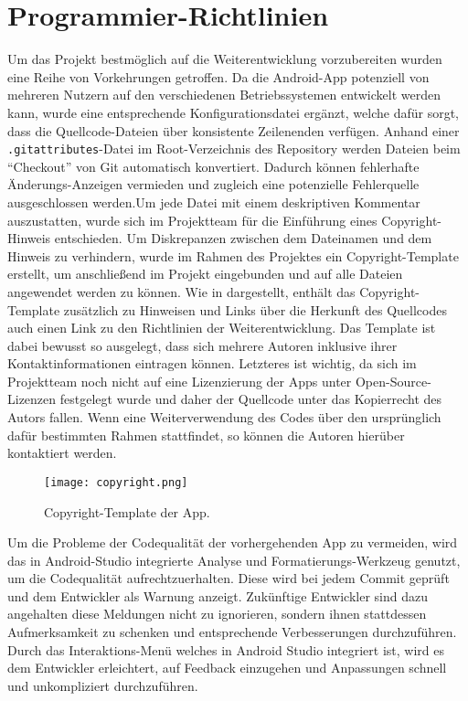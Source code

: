 \newpage

\section{Programmier-Richtlinien}

Um das Projekt bestmöglich auf die Weiterentwicklung vorzubereiten wurden eine Reihe von Vorkehrungen getroffen. 
\newline Da die Android-App potenziell von mehreren Nutzern auf den verschiedenen Betriebssystemen entwickelt werden kann, wurde eine entsprechende Konfigurationsdatei ergänzt, welche dafür sorgt, dass die Quellcode-Dateien über konsistente Zeilenenden verfügen. Anhand einer \texttt{.gitattributes}-Datei im Root-Verzeichnis des Repository werden Dateien beim \enquote{Checkout} von Git automatisch konvertiert. Dadurch können fehlerhafte Änderungs-Anzeigen vermieden und zugleich eine potenzielle Fehlerquelle ausgeschlossen werden.\newline Um jede Datei mit einem deskriptiven Kommentar auszustatten, wurde sich im Projektteam für die Einführung eines Copyright-Hinweis entschieden. Um Diskrepanzen zwischen dem Dateinamen und dem Hinweis zu verhindern, wurde im Rahmen des Projektes ein Copyright-Template erstellt, um anschließend im Projekt eingebunden und auf alle Dateien angewendet werden zu können. Wie in  dargestellt, enthält das Copyright-Template zusätzlich zu Hinweisen und Links über die Herkunft des Quellcodes auch einen Link zu den Richtlinien der Weiterentwicklung. Das Template ist dabei bewusst so ausgelegt, dass sich mehrere Autoren inklusive ihrer Kontaktinformationen eintragen können. Letzteres ist wichtig, da sich im Projektteam noch nicht auf eine Lizenzierung der Apps unter Open-Source-Lizenzen festgelegt wurde und daher der Quellcode unter das Kopierrecht des Autors fallen. Wenn eine Weiterverwendung des Codes über den ursprünglich dafür bestimmten Rahmen stattfindet, so können die Autoren hierüber kontaktiert werden.

\begin{figure}[H]
    \texttt{[image: copyright.png]}
    \caption{Copyright-Template der App.}\label{fig:copyright}
\end{figure}

Um die Probleme der Codequalität der vorhergehenden App zu vermeiden, wird das in Android-Studio integrierte Analyse und Formatierungs-Werkzeug genutzt, um die Codequalität aufrechtzuerhalten. Diese wird bei jedem Commit geprüft und dem Entwickler als Warnung anzeigt. Zukünftige Entwickler sind dazu angehalten diese Meldungen nicht zu ignorieren, sondern ihnen stattdessen Aufmerksamkeit zu schenken und entsprechende Verbesserungen durchzuführen. Durch das Interaktions-Menü welches in Android Studio integriert ist, wird es dem Entwickler erleichtert, auf Feedback einzugehen und Anpassungen schnell und unkompliziert durchzuführen.

